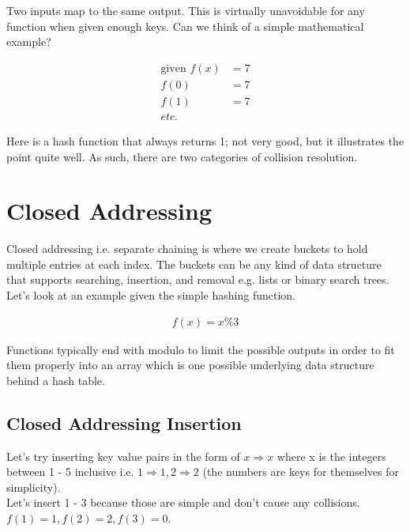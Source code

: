 \documentclass[11pt]{book}
\begin{document}
		\noindent Two inputs map to the same output. This is virtually unavoidable for
		any function when given enough keys. Can we think of a simple mathematical example?

		\begin{align}
			\text{given } f(x) &= 7 \\
			f(0) &= 7 \\
			f(1) &= 7 \\
			etc.
		\end{align}

		\noindent Here is a hash function that always returns 1; not very good, but it
		illustrates the point quite well. As such, there are two categories of
		collision resolution.

	\section{Closed Addressing}
		Closed addressing i.e. separate chaining is where we create buckets to hold
		multiple entries at each index. The buckets can be any kind of data structure
		that supports searching, insertion, and removal e.g. lists or binary search
		trees. Let's look at an example given the simple hashing function.

		\begin{align}
			f(x) = x \% 3
		\end{align}

		\noindent Functions typically end with modulo to limit the possible outputs in
		order to fit them properly into an array which is one possible underlying data
		structure behind a hash table.
		
	\subsection{Closed Addressing Insertion}
		Let's try inserting key value pairs in the form of $x \Rightarrow x$ where x is the integers
		between 1 - 5 inclusive i.e. $1 \Rightarrow 1, 2 \Rightarrow 2$ (the numbers are keys for themselves
		for simplicity).\\

		\noindent Let's insert 1 - 3 because those are simple and don't cause any
		collisions. $f(1) = 1, f(2) = 2, f(3) = 0$.
\end{document}
